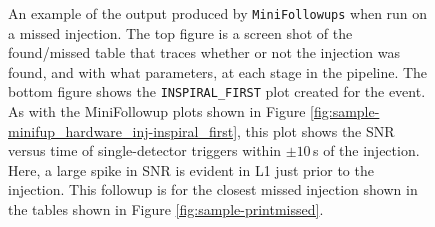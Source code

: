 \begin{figure}[p]
\center
{}
\label{fig:sample-minifup_missedinj}
\caption{An example of the output produced by \texttt{MiniFollowups} when run
on a missed injection. The top figure is a screen shot of the found/missed
table that traces whether or not the injection was found, and with what
parameters, at each stage in the pipeline. The bottom figure shows the
\texttt{INSPIRAL\_FIRST} plot created for the event. As with the MiniFollowup
plots shown in Figure \ref{fig:sample-minifup_hardware_inj-inspiral_first},
this plot shows the SNR versus time of single-detector triggers within $\pm
10\,$s of the injection. Here, a large spike in SNR is evident in L1 just prior
to the injection. This followup is for the closest missed injection shown in
the tables shown in Figure \ref{fig:sample-printmissed}.}
\end{figure}

